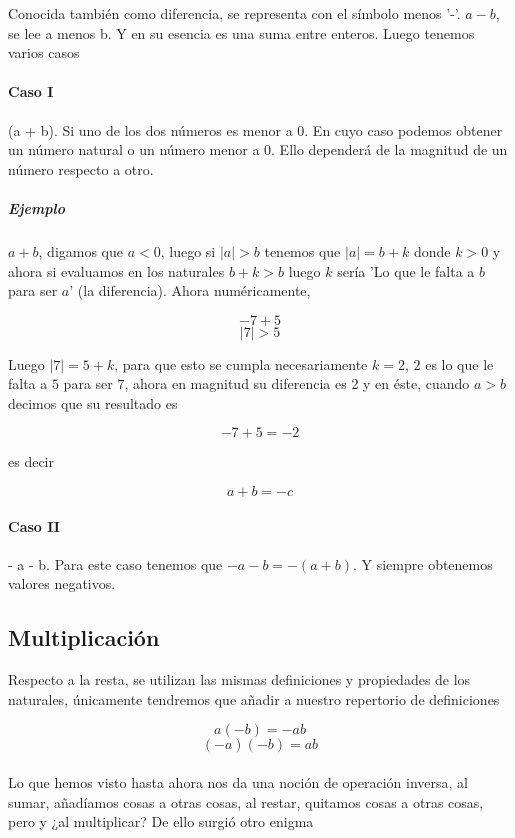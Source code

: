 \documentclass{article}
\begin{document}
Conocida también como diferencia, se representa con el símbolo menos '-'. $a - b$, se lee a menos b. Y en su esencia es una suma entre enteros. Luego tenemos varios casos

\paragraph{Caso I} (a + b). Si uno de los dos números es menor a 0. En cuyo caso podemos obtener un número natural o un número menor a 0. Ello dependerá de la magnitud de un número respecto a otro.

\subparagraph{Ejemplo} $a + b$, digamos que $a < 0$, luego si $|a| > b$ tenemos que $|a| = b + k$ donde $k>0$ y ahora si evaluamos en los naturales $b + k > b$ luego $k$ sería 'Lo que le falta a $b$ para ser $a$' (la diferencia). Ahora numéricamente, 

$$-7 + 5$$
$$|7| > 5$$

Luego $|7| = 5 + k$, para que esto se cumpla necesariamente $k = 2$, $2$ es lo que le falta a $5$ para ser $7$, ahora en magnitud su diferencia es 2 y en éste, cuando $a>b$ decimos que su resultado es 

$$-7 + 5 = -2$$

es decir

$$a + b = -c$$

\paragraph{Caso II} - a - b. Para este caso tenemos que $-a - b = -(a+b)$. Y siempre obtenemos valores negativos.

\subsection{Multiplicación}

Respecto a la resta, se utilizan las mismas definiciones y propiedades de los naturales, únicamente tendremos que añadir a nuestro repertorio de definiciones

$$a(-b) = -ab$$
$$(-a)(-b) = ab$$

\paragraph{} Lo que hemos visto hasta ahora nos da una noción de operación inversa, al sumar, añadíamos cosas a otras cosas, al restar, quitamos cosas a otras cosas, pero y ¿al multiplicar? De ello surgió otro enigma
\end{document}
